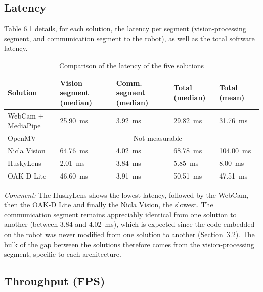 \documentclass[12pt,a4paper]{report}
\begin{document}
	\subsection*{Latency}
	
	Table 6.1 details, for each solution, the latency per segment (vision-processing segment, and communication segment to the robot), as well as the total software latency.
	
	\begin{table}[H]
		\centering
		\small
		\renewcommand{\arraystretch}{1.2}
		\begin{tabularx}{\textwidth}{|l|X|X|X|X|}
			\hline
			\textbf{Solution} & \textbf{Vision segment (median)} & \textbf{Comm. segment (median)} & \textbf{Total (median)} & \textbf{Total (mean)} \\
			\hline
			WebCam + MediaPipe & 25.90~ms & 3.92~ms & 29.82~ms & 31.76~ms \\
			\hline
			OpenMV & \multicolumn{4}{c|}{Not measurable} \\
			\hline
			Nicla Vision & 64.76~ms & 4.02~ms & 68.78~ms & 104.00~ms \\
			\hline
			HuskyLens & 2.01~ms & 3.84~ms & 5.85~ms & 8.00~ms \\
			\hline
			OAK-D Lite & 46.60~ms & 3.91~ms & 50.51~ms & 47.51~ms \\
			\hline
		\end{tabularx}
		\caption{Comparison of the latency of the five solutions}
		\label{tab:comparatif-latence}
	\end{table}
	
	\noindent\textit{Comment:} The HuskyLens shows the lowest latency, followed by the WebCam, then the OAK-D Lite and finally the Nicla Vision, the slowest. The communication segment remains appreciably identical from one solution to another (between 3.84 and 4.02~ms), which is expected since the code embedded on the robot was never modified from one solution to another (Section~3.2). The bulk of the gap between the solutions therefore comes from the vision-processing segment, specific to each architecture.
	
	\subsection*{Throughput (FPS)}
	
\end{document}

